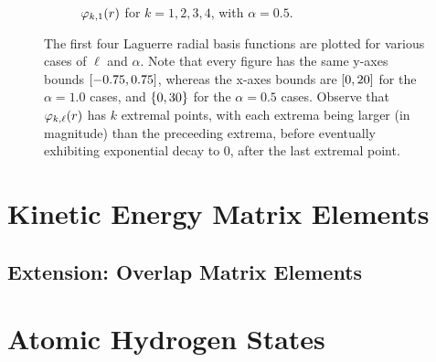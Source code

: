 \documentclass[]{article}
\begin{document}
\begin{figure}[h]
\begin{subfigure}[b]{0.45\linewidth}
    \caption{$\varphi_{k, 1}(r)$ for $k = 1, 2, 3, 4$, with $\alpha = 0.5$.}
    \label{fig:laguerre-1-0.5}
  \end{subfigure}

  \caption{
    The first four Laguerre radial basis functions are plotted for various cases
    of $\ell$ and $\alpha$.
    Note that every figure has the same y-axes bounds $[-0.75, 0.75]$,
    whereas the x-axes bounds are $[0, 20]$ for the $\alpha = 1.0$ cases,
    and $\lbrace0, 30\rbrace$ for the $\alpha = 0.5$ cases.
    Observe that $\varphi_{k, \ell}(r)$ has $k$ extremal points, with
    each extrema being larger (in magnitude) than the preceeding extrema, before
    eventually exhibiting exponential decay to 0, after the last extremal point.
  }
  \label{fig:laguerre}
\end{figure}




\section{Kinetic Energy Matrix Elements}
\label{sec:kinet-energy-matr}


\subsection{Extension: Overlap Matrix Elements}
\label{sec:extens-overl-matr}


\section{Atomic Hydrogen States}
\label{sec:atom-hydr-stat}
\end{document}
